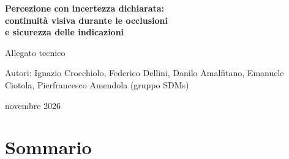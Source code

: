 
\newcommand{\autori}{Ignazio Crocchiolo, Federico Dellini, Danilo Amalfitano, Emanuele Ciotola, Pierfrancesco Amendola (gruppo SDMs)}

\begin{titlepage}
\centering
\vspace*{4cm}
{\LARGE\bfseries\color{accent} Percezione con incertezza dichiarata:\\[4pt] continuità visiva durante le occlusioni\\[4pt] e sicurezza delle indicazioni\par}
\vspace{1.2cm}
{\Large Allegato tecnico\par}
\vspace{2.5cm}
{\large Autori: \autori\par}
\vspace{0.8cm}
{\large novembre 2026\par}
\vfill
\end{titlepage}

\section*{Sommario}


\tableofcontents
\clearpage

\clearpage









\clearpage
\appendix


\clearpage
\begingroup\sloppy\def\UrlBreaks{\do\/\do\-\do\_\do\.}


\endgroup

